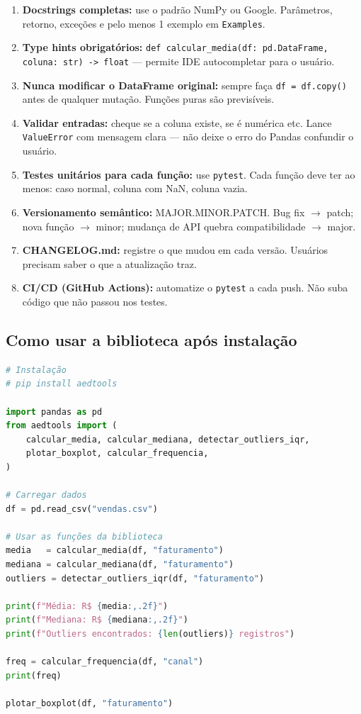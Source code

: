 \begin{enumerate}[leftmargin=*]
  \item \textbf{Docstrings completas:} use o padrão NumPy ou Google.
  Parâmetros, retorno, exceções e pelo menos 1 exemplo em \texttt{Examples}.
  \item \textbf{Type hints obrigatórios:} \texttt{def calcular\_media(df: pd.DataFrame, coluna: str) -> float}
  — permite IDE autocompletar para o usuário.
  \item \textbf{Nunca modificar o DataFrame original:} sempre faça
  \texttt{df = df.copy()} antes de qualquer mutação. Funções puras são previsíveis.
  \item \textbf{Validar entradas:} cheque se a coluna existe, se é numérica etc.
  Lance \texttt{ValueError} com mensagem clara — não deixe o erro do Pandas confundir o usuário.
  \item \textbf{Testes unitários para cada função:} use \texttt{pytest}.
  Cada função deve ter ao menos: caso normal, coluna com NaN, coluna vazia.
  \item \textbf{Versionamento semântico:} MAJOR.MINOR.PATCH.
  Bug fix $\to$ patch; nova função $\to$ minor; mudança de API quebra compatibilidade $\to$ major.
  \item \textbf{CHANGELOG.md:} registre o que mudou em cada versão.
  Usuários precisam saber o que a atualização traz.
  \item \textbf{CI/CD (GitHub Actions):} automatize o \texttt{pytest} a cada push.
  Não suba código que não passou nos testes.
\end{enumerate}

\subsection*{Como usar a biblioteca após instalação}

\begin{lstlisting}[language=Python]
# Instalação
# pip install aedtools

import pandas as pd
from aedtools import (
    calcular_media, calcular_mediana, detectar_outliers_iqr,
    plotar_boxplot, calcular_frequencia,
)

# Carregar dados
df = pd.read_csv("vendas.csv")

# Usar as funções da biblioteca
media   = calcular_media(df, "faturamento")
mediana = calcular_mediana(df, "faturamento")
outliers = detectar_outliers_iqr(df, "faturamento")

print(f"Média: R$ {media:,.2f}")
print(f"Mediana: R$ {mediana:,.2f}")
print(f"Outliers encontrados: {len(outliers)} registros")

freq = calcular_frequencia(df, "canal")
print(freq)

plotar_boxplot(df, "faturamento")
\end{lstlisting}

